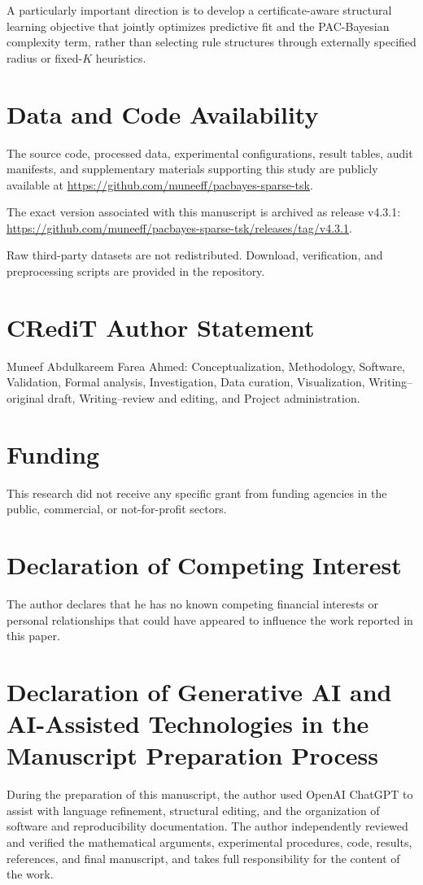 A particularly important direction is to develop a certificate-aware structural learning objective that jointly optimizes predictive fit and the PAC-Bayesian complexity term, rather than selecting rule structures through externally specified
radius or fixed-$K$ heuristics.


\section*{Data and Code Availability}

The source code, processed data, experimental configurations,
result tables, audit manifests, and supplementary materials
supporting this study are publicly available at
\url{https://github.com/muneeff/pacbayes-sparse-tsk}.

The exact version associated with this manuscript is archived as
release v4.3.1:
\url{https://github.com/muneeff/pacbayes-sparse-tsk/releases/tag/v4.3.1}.

Raw third-party datasets are not redistributed. Download,
verification, and preprocessing scripts are provided in the
repository.


\section*{CRediT Author Statement}
Muneef Abdulkareem Farea Ahmed: Conceptualization,
Methodology, Software, Validation, Formal analysis,
Investigation, Data curation, Visualization, Writing--original
draft, Writing--review and editing, and Project administration.

\section*{Funding}
This research did not receive any specific grant from funding
agencies in the public, commercial, or not-for-profit sectors.

\section*{Declaration of Competing Interest}
The author declares that he has no known competing financial
interests or personal relationships that could have appeared to
influence the work reported in this paper.

\section*{Declaration of Generative AI and AI-Assisted
	Technologies in the Manuscript Preparation Process}

During the preparation of this manuscript, the author used OpenAI ChatGPT to assist with language refinement, structural editing, and the organization of software and reproducibility documentation. The author independently reviewed and verified the mathematical arguments, experimental procedures, code, results, references, and final manuscript, and takes full responsibility for the content of the work.